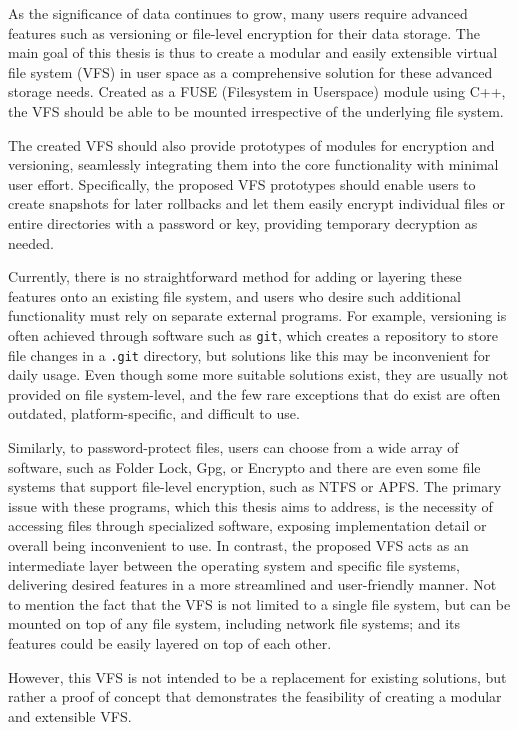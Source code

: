 
As the significance of data continues to grow, many users require advanced features such as versioning or file-level encryption for their data storage.
The main goal of this thesis is thus to create a modular and easily extensible virtual file system (VFS) in user space as a comprehensive solution for these advanced storage needs.
Created as a FUSE (Filesystem in Userspace) module using C++, the VFS should be able to be mounted irrespective of the underlying file system.

The created VFS should also provide prototypes of modules for encryption and versioning, seamlessly integrating them into the core functionality with minimal user effort.
Specifically, the proposed VFS prototypes should enable users to create snapshots for later rollbacks and let them easily encrypt individual files or entire directories with a password or key, providing temporary decryption as needed.

Currently, there is no straightforward method for adding or layering these features onto an existing file system, and users who desire such additional functionality must rely on separate external programs.
For example, versioning is often achieved through software such as \texttt{git}, which creates a repository to store file changes in a \texttt{.git} directory, but solutions like this may be inconvenient for daily usage.
Even though some more suitable solutions exist, they are usually not provided on file system-level, and the few rare exceptions that do exist are often outdated, platform-specific, and difficult to use.

Similarly, to password-protect files, users can choose from a wide array of software, such as Folder Lock, Gpg, or Encrypto and there are even some file systems that support file-level encryption, such as NTFS or APFS\@.
The primary issue with these programs, which this thesis aims to address, is the necessity of accessing files through specialized software, exposing implementation detail or overall being inconvenient to use.
In contrast, the proposed VFS acts as an intermediate layer between the operating system and specific file systems, delivering desired features in a more streamlined and user-friendly manner.
Not to mention the fact that the VFS is not limited to a single file system, but can be mounted on top of any file system, including network file systems; and its features could be easily layered on top of each other.

However, this VFS is not intended to be a replacement for existing solutions, but rather a proof of concept that demonstrates the feasibility of creating a modular and extensible VFS\@.

